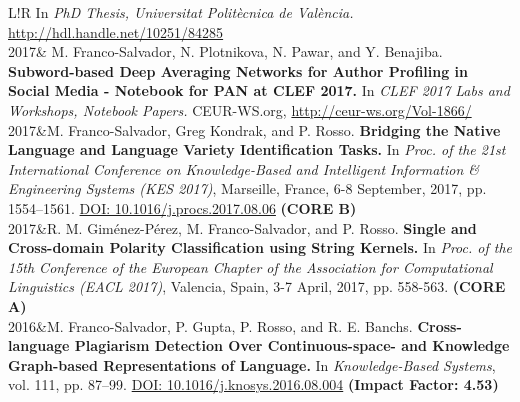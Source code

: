 \documentclass[10pt]{article}
\begin{document}
\begin{tabular}{L!{\VRule}R}
	In \emph{PhD Thesis, Universitat Polit{\`e}cnica de Val{\`e}ncia.} \href{http://hdl.handle.net/10251/84285}{http://hdl.handle.net/10251/84285}\vspace{5pt}\\
	2017& M. Franco-Salvador, N. Plotnikova, N. Pawar, and Y. Benajiba. \textbf{Subword-based Deep Averaging Networks for Author Profiling in Social Media - Notebook for PAN at CLEF 2017.}
	In \emph{CLEF 2017 Labs and Workshops, Notebook Papers.} CEUR-WS.org, \href{http://ceur-ws.org/Vol-1866/}{http://ceur-ws.org/Vol-1866/} \vspace{5pt}\\
    2017&M. Franco-Salvador, Greg Kondrak, and P. Rosso. \textbf{Bridging the Native Language and Language Variety Identification Tasks.}
	In \emph{Proc. of the 21st International Conference on Knowledge-Based and Intelligent Information \& Engineering Systems (KES 2017)}, Marseille, France, 6-8 September, 2017, pp. 1554--1561. \href{https://doi.org/10.1016/j.procs.2017.08.068}{DOI: 10.1016/j.procs.2017.08.06} \textbf{(CORE B)}\vspace{5pt}\\
	2017&R. M. Gim{\'e}nez-P{\'e}rez, M. Franco-Salvador, and P. Rosso. \textbf{Single and Cross-domain Polarity Classification using String Kernels.}
	In \emph{Proc. of the 15th Conference of the European Chapter of the Association for Computational Linguistics (EACL 2017)}, Valencia, Spain, 3-7 April, 2017, pp. 558-563. \textbf{(CORE A)}\vspace{5pt}\\	
    2016&M. Franco-Salvador, P. Gupta, P. Rosso, and R. E. Banchs. \textbf{Cross-language Plagiarism Detection Over Continuous-space- and Knowledge Graph-based Representations of Language.}
	In \emph{Knowledge-Based Systems}, vol. 111, pp. 87--99. \href{http://dx.doi.org/10.1016/j.knosys.2016.08.004}{DOI: 10.1016/j.knosys.2016.08.004} \textbf{(Impact Factor: 4.53)} \vspace{5pt}\\
\end{tabular}
\end{document}
